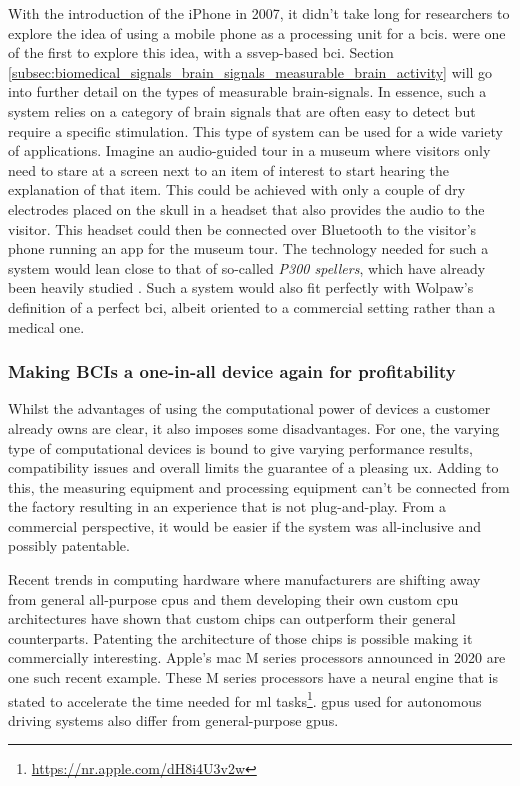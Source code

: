 With the introduction of the iPhone in 2007, it didn't take long for researchers to explore the idea of using a mobile phone as a processing unit for a \glspl{bci}.
\citet{early_bci_phone} were one of the first to explore this idea, with a \gls{ssvep}-based \gls{bci}.
Section \ref{subsec:biomedical_signals_brain_signals_measurable_brain_activity} will go into further detail on the types of measurable brain-signals.
In essence, such a system relies on a category of brain signals that are often easy to detect but require a specific stimulation.
This type of system can be used for a wide variety of applications.
Imagine an audio-guided tour in a museum where visitors only need to stare at a screen next to an item of interest to start hearing the explanation of that item.
This could be achieved with only a couple of dry electrodes placed on the skull in a headset that also provides the audio to the visitor.
This headset could then be connected over Bluetooth to the visitor's phone running an app for the museum tour.
The technology needed for such a system would lean close to that of so-called \textit{P300 spellers}, which have already been heavily studied \citep{p300_spellers_review, p300_keyboard_flashing, p300_spellers}.
Such a system would also fit perfectly with Wolpaw's definition of a perfect \gls{bci}, albeit oriented to a commercial setting rather than a medical one.


\subsubsection{Making BCIs a one-in-all device again for profitability}
\label{subsubsec:bci_gaining_popularity_better_processing_profitibility}

Whilst the advantages of using the computational power of devices a customer already owns are clear, it also imposes some disadvantages.
For one, the varying type of computational devices is bound to give varying performance results, compatibility issues and overall limits the guarantee of a pleasing \gls{ux}.
Adding to this, the measuring equipment and processing equipment can't be connected from the factory resulting in an experience that is not plug-and-play.
From a commercial perspective, it would be easier if the system was all-inclusive and possibly patentable. 

Recent trends in computing hardware where manufacturers are shifting away from general all-purpose \glspl{cpu} and them developing their own custom \gls{cpu} architectures have shown that custom chips can outperform their general counterparts.
Patenting the architecture of those chips is possible making it commercially interesting.
Apple's mac M series processors announced in 2020 are one such recent example.
These M series processors have a neural engine that is stated to accelerate the time needed for \gls{ml} tasks\footnote{\url{https://nr.apple.com/dH8i4U3v2w}}.
\Glspl{gpu} used for autonomous driving systems also differ from general-purpose \glspl{gpu}.

